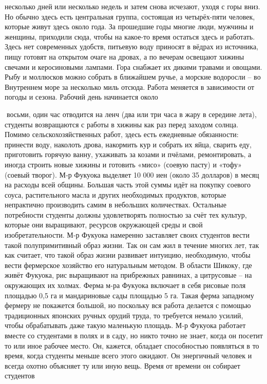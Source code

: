 \documentclass[a4paper]{book}
\begin{document}
несколько дней или несколько недель и затем снова исчезают, уходя с горы вниз. Но обычно
здесь есть центральная группа, состоящая из четырёх-пяти человек, которые живут здесь
около года. За прошедшие годы многие люди, мужчины и женщины, приходили сюда, чтобы
на какое-то время остаться здесь и работать. Здесь нет современных удобств, питьевую воду
приносят в вёдрах из источника, пищу готовят на открытом очаге на дровах, а по вечерам
освещают хижины свечами и керосиновыми лампами. Гора снабжает их дикими травами и
овощами. Рыбу и моллюсков можно собрать в ближайшем ручье, а морские водоросли – во
Внутреннем море за несколько миль отсюда.
Работа меняется в зависимости от погоды и сезона. Рабочий день начинается около

восьми, один час отводится на ленч (два или три часа в жару в середине лета), студенты
возвращаются с работы в хижины как раз перед заходом солнца. Помимо
сельскохозяйственных работ, здесь есть ежедневные обязанности: принести воду, наколоть
дрова, накормить кур и собрать их яйца, сварить еду, приготовить горячую ванну, ухаживать
за козами и пчёлами, ремонтировать, а иногда строить новые хижины и готовить «мисо»
(соевую пасту) и «тофу» (соевый творог).
М‑р Фукуока выделяет 10 000 иен (около 35 долларов) в месяц на расходы всей общины.
Большая часть этой суммы идёт на покупку соевого соуса, растительного масла и других
необходимых продуктов, которые непрактично производить самим в небольших количествах.
Остальные потребности студенты должны удовлетворять полностью за счёт тех культур,
которые они выращивают, ресурсов окружающей среды и свой изобретательности. М‑р
Фукуока намеренно заставляет своих студентов вести такой полупримитивный образ жизни.
Так он сам жил в течение многих лет, так как считает, что такой образ жизни развивает
интуицию, необходимую, чтобы вести фермерское хозяйство его натуральным методом.
В области Шикоку, где живёт Фукуока, рис выращивают на прибрежных равнинах, а
цитрусовые – на окружающих их холмах. Ферма м-ра Фукуока включает в себя рисовые поля
площадью 0,5 га и мандариновые сады площадью 5 га. Такая ферма западному фермеру не
покажется большой, но поскольку вся работа делается с помощью традиционных японских
ручных орудий труда, то требуется немало усилий, чтобы обрабатывать даже такую
маленькую площадь.
М‑р Фукуока работает вместе со студентами в полях и в саду, но никто точно не знает,
когда он посетит то или иное рабочее место. Он, кажется, обладает способностью
появляться в то время, когда студенты меньше всего этого ожидают. Он энергичный человек
и всегда охотно объясняет ту или иную вещь. Время от времени он собирает студентов
\end{document}

